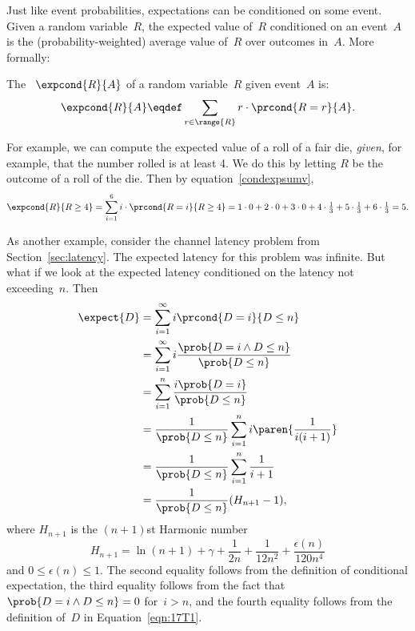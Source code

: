 Just like event probabilities, expectations can be conditioned on some
event.  Given a random variable~$R$, the expected value of~$R$
conditioned on an event~$A$ is the (probability-weighted) average
value of~$R$ over outcomes in~$A$.  More formally:
\begin{definition}\label{condexpdef}
The ~$\expcond{R}{A}$ of a random
variable~$R$ given event~$A$ is:
\begin{equation}\label{condexpsumv}
\expcond{R}{A} \eqdef \sum_{r \in \range{R}} r \cdot\prcond{R=r}{A}.
\end{equation}
\end{definition}

For example, we can compute the expected value of a roll of a fair die,
\emph{given}, for example, that the number rolled is at least 4.  We do
this by letting $R$ be the outcome of a roll of the die.  Then
by equation~\eqref{condexpsumv},
\[
\expcond{R}{R \geq 4} = \sum_{i=1}^6 i \cdot \prcond{R=i}{R \ge 4}
= 1\cdot 0 + 2\cdot 0 + 3\cdot 0 +
  4\cdot\tfrac{1}{3} + 5\cdot\tfrac{1}{3} + 6\cdot\tfrac{1}{3}
= 5.
\]

As another example, consider the channel latency problem from
Section~\ref{sec:latency}.  The expected latency for this problem was
infinite.  But what if we look at the expected latency conditioned on
the latency not exceeding~$n$.  Then
\begin{align*}
\expect{D}
    &= \sum_{i = 1}^\infty i \prcond{D = i}{D \le n} \\
    &= \sum_{i = 1}^\infty i \frac{\prob{D = i \land D \le n}}
                                  {\prob{D \le n}} \\
    &= \sum_{i = 1}^n \frac{i \prob{D = i}}{\prob{D \le n}} \\
    &= \frac{1}{\prob{D \le n}} \sum_{i = 1}^n i \paren{\frac{1}{i(i + 1)}}\\
    &= \frac{1}{\prob{D \le n}} \sum_{i = 1}^n \frac{1}{i + 1} \\
    &= \frac{1}{\prob{D \le n}} (H_{n+ 1} - 1),
\end{align*}
where $H_{n + 1}$ is the $(n + 1)$st Harmonic number
\begin{equation*}
    H_{n + 1} = \ln(n + 1) + \gamma + \frac{1}{2n} + \frac{1}{12n^2} +
    \frac{\epsilon(n)}{120n^4}
\end{equation*}
and $0 \le \epsilon(n) \le 1$.  The second equality follows from
the definition of conditional expectation, the third equality follows
from the fact that $\prob{D = i \land D \le n} = 0$ for~$i > n$, and
the fourth equality follows from the definition of~$D$ in
Equation~\ref{eqn:17T1}.

